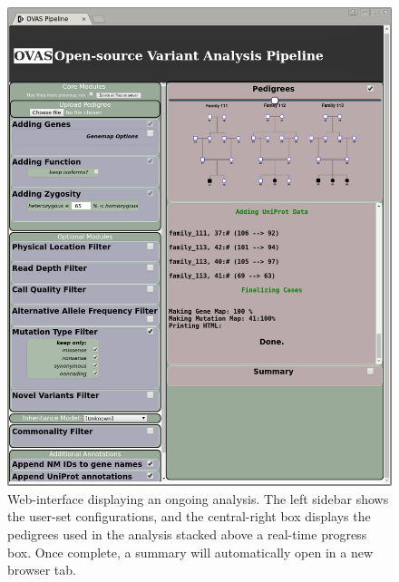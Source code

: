 \documentclass{bioinfo}
\begin{document}
\begin{methods}
\begin{figure}[!tpb]
  \centerline{\includegraphics[width=\columnwidth]{pipe_3_final.jpg}}\caption{Web-interface displaying an ongoing analysis. The left sidebar shows the user-set configurations, and the central-right box displays the pedigrees used in the analysis stacked above a real-time progress box. Once complete, a summary will automatically open in a new browser tab.}\label{fig:webend}
\end{figure}\
\begin{figure}[!tpb]

\end{figure}
\end{methods}
\end{document}
